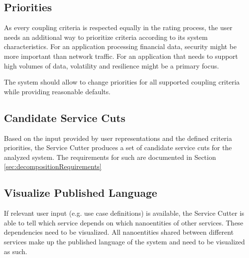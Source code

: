 \subsection{Priorities}

As every coupling criteria is respected equally in the rating process, the user needs an additional way to prioritize criteria according to its system characteristics. For an application processing financial data, security might be more important than network traffic. For an application that needs to support high volumes of data, volatility and resilience might be a primary focus.

The system should allow to change priorities for all supported coupling criteria while providing reasonable defaults. 

\subsection{Candidate Service Cuts}

Based on the input provided by user representations and the defined criteria priorities, the Service Cutter produces a set of candidate service cuts for the analyzed system. The requirements for such are documented in Section \ref{sec:decompositionRequirements}

\subsection{Visualize Published Language}

If relevant user input (e.g. use case definitions) is available, the Service Cutter is able to tell which service depends on which nanoentities of other services. These dependencies need to be visualized. All nanoentities shared between different services make up the published language of the system and need to be visualized as such.
